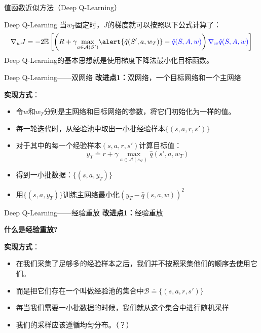 \begin{section}{值函数近似方法\alert{（Deep Q-Learning）}}
\begin{frame}{Deep Q-Learning}
    当$w_T$固定时，$J$的梯度就可以按照以下公式计算了：
    \[
        \nabla_wJ=-2\mathbb{E}\left[\left(R+\gamma \underset{a\in \mathcal{A}(S')}{\max}\alert{\hat{q}(S',a,w_T)}-\textcolor{blue}{\hat{q}(S,A,w)}\right) \textcolor{blue}{\nabla_w\hat{q}(S,A,w)}\right]
    \]
    Deep Q-Learning的基本思想就是使用梯度下降法最小化目标函数。
\end{frame}

\begin{frame}{Deep Q-Learning——双网络}
    \textbf{改进点1：}\alert{双网络，一个目标网络和一个主网络}

    \textbf{实现方式}：
    \begin{itemize}
        \item 令$w$和$w_T$分别是主网络和目标网络的参数，将它们初始化为一样的值。
        \item 每一轮迭代时，从经验池中取出一小批经验样本$\{(s,a,r,s')\}$
        \item 对于其中的每一个经验样本$(s,a,r,s')$计算目标值：
        \[
            y_T\doteq r+\gamma \underset{a\in \mathcal{A}(s_{S'})}{\max}\hat{q}(s',a,w_T)
        \]
        \item 得到一小批数据：$\{(s,a,y_T)\}$
        \item 用$\{(s,a,y_T)\}$训练主网络最小化$(y_T-\hat{q}(s,a,w))^2$
    \end{itemize}
\end{frame}

\begin{frame}{Deep Q-Learning——经验重放}
    \textbf{改进点1：}\alert{经验重放}

    \textbf{什么是经验重放?}

    \textbf{实现方式}：
    \begin{itemize}
        \item 在我们采集了足够多的经验样本之后，我们\alert{并不按照采集他们的顺序去使用它们}。
        \item 而是把它们存在一个叫做\alert{经验池}的集合中\alert{$\mathcal{B}\doteq\{(s,a,r,s')\}$}
        \item 每当我们需要一小批数据的时候，我们就从这个集合中进行随机采样
        \item 我们的采样应该遵循均匀分布。（？）
    \end{itemize}
\end{frame}


\end{section}

